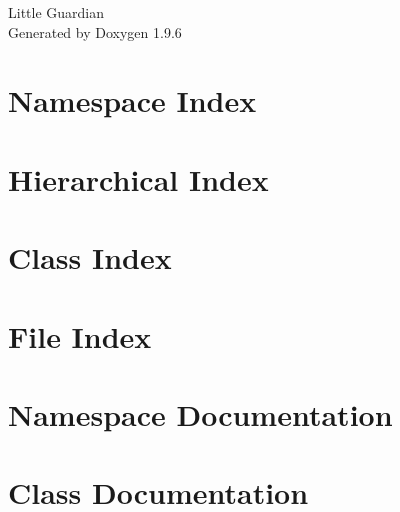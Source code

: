 \documentclass[twoside]{book}
\newcommand{\+}{\discretionary{\mbox{\scriptsize$\hookleftarrow$}}{}{}}
\newcommand{\clearemptydoublepage}{%
    \newpage{\pagestyle{empty}\cleardoublepage}%
  }
\begin{document}
  \raggedbottom
  \begin{CJK}{UTF8}{min}
    \hypersetup{pageanchor=false,
                bookmarksnumbered=true,
                pdfencoding=unicode
               }
  \begin{titlepage}
  \vspace*{7cm}
  \begin{center}%
  {\Large Little Guardian}\\
  \vspace*{1cm}
  {\large Generated by Doxygen 1.9.6}\\
  \end{center}
  \end{titlepage}
  \clearemptydoublepage
  \tableofcontents
  \clearemptydoublepage
  \hypersetup{pageanchor=true}
\chapter{Namespace Index}

\chapter{Hierarchical Index}

\chapter{Class Index}

\chapter{File Index}

\chapter{Namespace Documentation}

\chapter{Class Documentation}





















\end{CJK}
\end{document}
